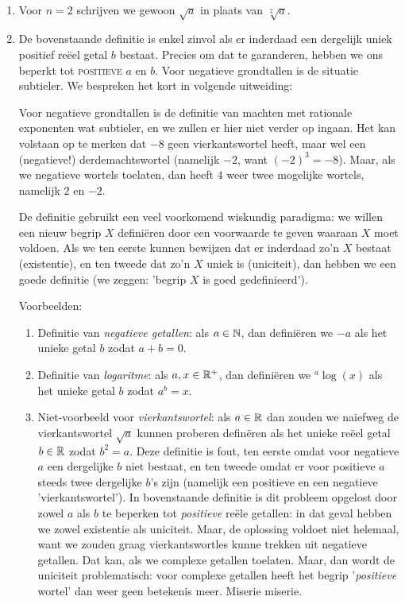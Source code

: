 \documentclass{ximera}
\begin{document}
\begin{remark} \ 
\begin{enumerate}
	\item Voor $n=2$ schrijven we gewoon $\sqrt{a}$ in plaats van $\sqrt[2]{a}$.
	\item De bovenstaande definitie is enkel zinvol als er inderdaad een dergelijk uniek positief reëel getal $b$ bestaat. Precies om dat te garanderen, hebben we ons beperkt tot \textsc{positieve} $a$ en $b$. Voor negatieve grondtallen is de situatie subtieler. We bespreken het kort in volgende uitweiding:
	\begin{uitweiding}
		\begin{expandable}
	Voor negatieve grondtallen is de definitie van machten met rationale exponenten wat subtieler, en we zullen er hier niet verder op ingaan. Het kan volstaan op te merken dat $-8$ geen vierkantswortel heeft, maar wel een (negatieve!) derdemachtswortel (namelijk $-2$, want $(-2)^3 = -8$). Maar, als we negatieve wortels toelaten, dan heeft $4$ weer twee mogelijke wortels, namelijk $2$ en $-2$.  
			
	De definitie gebruikt een veel voorkomend wiskundig paradigma: we willen een nieuw begrip $X$  definiëren door een voorwaarde te geven waaraan $X$ moet voldoen. Als we ten eerste kunnen bewijzen dat er inderdaad zo'n $X$ bestaat (existentie), en ten tweede dat zo'n $X$ uniek is (uniciteit), dan hebben we een goede definitie (we zeggen: 'begrip $X$ is goed gedefinieerd').
	
	Voorbeelden:
	\begin{enumerate}
		\item Definitie van \textit{negatieve getallen}: als $a\in\mathbb{N}$, dan definiëren we $-a$ als het unieke getal $b$ zodat $a + b = 0$. 
		\item Definitie van \textit{logaritme}: als $a,x\in\mathbb{R}^+$, dan definiëren we ${}^a\log(x)$ als het unieke getal $b$ zodat $a^b = x$.  
		\item Niet-voorbeeld voor \textit{vierkantswortel}: als $a\in\mathbb{R}$ dan zouden we naiefweg de vierkantswortel $\sqrt{a}$ kunnen proberen definëren als het unieke reëel getal $b\in\mathbb{R}$ zodat $b^2 = a$. Deze definitie is fout,  ten eerste omdat voor negatieve $a$ een dergelijke $b$ niet bestaat, en ten tweede omdat er voor positieve $a$ steeds twee dergelijke $b$'s zijn (namelijk een positieve en een negatieve 'vierkantswortel'). In bovenstaande definitie is dit probleem opgelost door zowel $a$ als $b$ te beperken tot \textit{positieve} reële getallen: in dat geval hebben we zowel existentie als uniciteit. Maar, de oplossing voldoet niet helemaal, want we zouden graag vierkantswortles kunne trekken uit negatieve getallen. Dat kan, als we complexe getallen toelaten. Maar, dan wordt de uniciteit problematisch: voor complexe getallen heeft het begrip '\textit{positieve} wortel' dan weer geen betekenis meer. Miserie miserie. 
	\end{enumerate}
\end{expandable}
\end{uitweiding}


\end{enumerate}
\end{remark}
\end{document}
